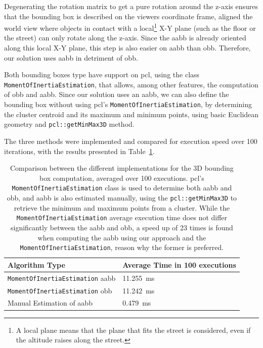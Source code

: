 Degenerating the rotation matrix to get a pure rotation around the z-axis ensures that the bounding box is described on the viewers coordinate frame, aligned the world view where objects in contact with a local\footnote{A local plane means that the plane that fits the street is considered, even if the altitude raises along the street.} X-Y plane (such as the floor or the street) can only rotate along the z-axis. Since the \ac{aabb} is already oriented along this local X-Y plane, this step is also easier on \ac{aabb} than \ac{obb}. Therefore, our solution uses \acf{aabb} in detriment of \ac{obb}.


Both bounding boxes type have support on \ac{pcl}, using the class \texttt{MomentOfInertiaEstimation}, that allows, among other features, the computation of \ac{obb} and \ac{aabb}. Since our solution uses an \ac{aabb}, we can also define the bounding box without using \ac{pcl}'s \texttt{MomentOfInertiaEstimation}, by determining the cluster centroid and its maximum and minimum points, using basic Euclidean geometry and \texttt{pcl::getMinMax3D} method.

The three methods were implemented and compared for execution speed over 100 iterations, with the results presented in Table~\ref{tab:bounding-box-estimation-times}.

\begin{table}[H]
	\centering
	\renewcommand{\arraystretch}{1.2}
	\begin{tabular}{@{}p{8cm}l@{}}
		\toprule
		Algorithm Type & Average Time in 100 executions \\
		\midrule
		\texttt{MomentOfInertiaEstimation} \ac{aabb} & \SI{11.255}{\milli\second} \\
		\texttt{MomentOfInertiaEstimation} \ac{obb} & \SI{11.242}{\milli\second} \\
		Manual Estimation of \ac{aabb}& \SI{0.479}{\milli\second} \\
		\bottomrule
	\end{tabular}
	\caption[Execution time comparison between methods to compute the tridimensional bounding boxes.]{Comparison between the different implementations for the 3D bounding box computation, averaged over 100 executions. \ac{pcl}'s \texttt{MomentOfInertiaEstimation} class is used to determine both \ac{aabb} and \ac{obb}, and \ac{aabb} is also estimated manually, using the \texttt{pcl::getMinMax3D} to retrieve the minimum and maximum points from a cluster. While the \texttt{MomentOfInertiaEstimation} average execution time does not differ significantly between the \ac{aabb} and \ac{obb}, a speed up of 23 times is found when computing the \ac{aabb} using our approach and the \texttt{MomentOfInertiaEstimation}, reason why the former is preferred.} 
	\label{tab:bounding-box-estimation-times}
\end{table}

